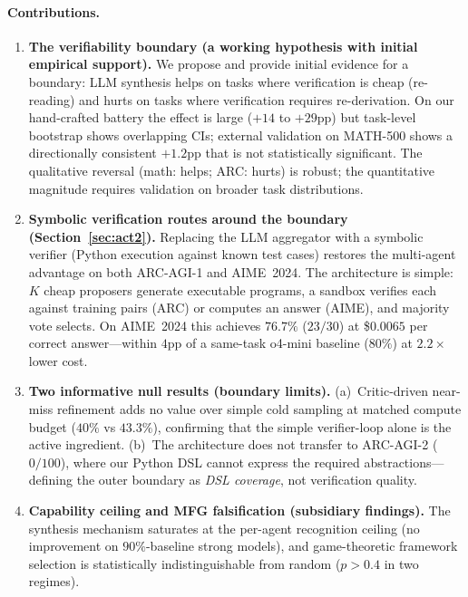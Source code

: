 \documentclass[11pt]{amsart}
\newcommand\1{{\mathds{1}}}
\theoremstyle{definition}
\theoremstyle{remark}
\numberwithin{equation}{section}
\begin{document}
\paragraph{Contributions.}
\begin{enumerate}[leftmargin=1.2em, itemsep=2pt]
\item \textbf{The verifiability boundary (a working hypothesis with initial empirical support).}
We propose and provide initial evidence for a boundary: LLM synthesis helps on tasks where verification is cheap (re-reading) and hurts on tasks where verification requires re-derivation.
On our hand-crafted battery the effect is large ($+14$ to $+29$pp) but task-level bootstrap shows overlapping CIs; external validation on MATH-500 shows a directionally consistent $+1.2$pp that is not statistically significant.
The qualitative reversal (math: helps; ARC: hurts) is robust; the quantitative magnitude requires validation on broader task distributions.
\item \textbf{Symbolic verification routes around the boundary (Section~\ref{sec:act2}).}
Replacing the LLM aggregator with a symbolic verifier (Python execution against known test cases) restores the multi-agent advantage on both ARC-AGI-1 and AIME~2024.
The architecture is simple: $K$ cheap proposers generate executable programs, a sandbox verifies each against training pairs (ARC) or computes an answer (AIME), and majority vote selects.
On AIME~2024 this achieves $76.7\%$ ($23/30$) at \$$0.0065$ per correct answer---within $4$pp of a same-task o4-mini baseline ($80\%$) at $2.2\times$ lower cost.
\item \textbf{Two informative null results (boundary limits).}
(a)~Critic-driven near-miss refinement adds no value over simple cold sampling at matched compute budget ($40\%$ vs $43.3\%$), confirming that the simple verifier-loop alone is the active ingredient.
(b)~The architecture does not transfer to ARC-AGI-2 ($0/100$), where our Python DSL cannot express the required abstractions---defining the outer boundary as \emph{DSL coverage}, not verification quality.
\item \textbf{Capability ceiling and MFG falsification (subsidiary findings).}
The synthesis mechanism saturates at the per-agent recognition ceiling (no improvement on $90\%$-baseline strong models), and game-theoretic framework selection is statistically indistinguishable from random ($p > 0.4$ in two regimes).
\end{enumerate}
\end{document}
